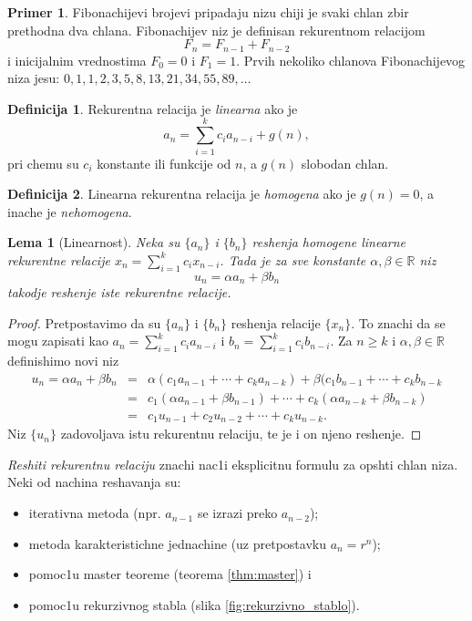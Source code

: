 \documentclass{article}
\newtheorem{lema}{Lema}[section]
\theoremstyle{definition}
\newtheorem{definicija}{Definicija}[section]
\newtheorem{primer}{Primer}[section]
\begin{document}
\begin{primer}
Fibonachijevi brojevi pripadaju nizu chiji je svaki chlan zbir prethodna dva chlana. Fibonachijev niz je definisan rekurentnom relacijom $$F_n = F_{n-1} + F_{n-2}$$ i inicijalnim vrednostima $F_0 = 0$ i $F_1 = 1$. Prvih nekoliko chlanova Fibonachijevog niza jesu: $0,1,1,2,3,5,8,13,21,34,55,89,\ldots$
\end{primer}

\begin{definicija}
Rekurentna relacija je \emph{linearna} ako je $$a_n = \sum_{i=1}^{k} c_i a_{n-i} + g(n),$$ pri chemu su $c_i$ konstante ili funkcije od $n$, a $g(n)$ slobodan chlan.
\end{definicija}

\begin{definicija}
Linearna rekurentna relacija je \emph{homogena} ako je $g(n) = 0$, a inache je \emph{nehomogena}.
\end{definicija}

\begin{lema}[Linearnost]
Neka su $\{a_n\}$ i $\{b_n\}$ reshenja homogene linearne rekurentne relacije $x_n = \sum_{i=1}^{k} c_i x_{n-i}$. Tada je za sve konstante $\alpha,\beta\in\mathbb{R}$ niz $$u_n = \alpha a_n + \beta b_n$$ takodje reshenje iste rekurentne relacije.
\end{lema}

\begin{proof}
Pretpostavimo da su $\{a_n\}$ i $\{b_n\}$ reshenja relacije $\{x_n\}$. To znachi da se mogu zapisati kao $a_n = \sum_{i=1}^{k} c_i a_{n-i}$ i $b_n = \sum_{i=1}^{k} c_i b_{n-i}$.
Za $n\geqslant k$ i $\alpha,\beta\in\mathbb{R}$ definishimo novi niz
\begin{eqnarray*}
u_n = \alpha a_n + \beta b_n & = & \alpha(c_1 a_{n-1} +\cdots + c_k a_{n-k})+\beta(c_1 b_{n-1} +\cdots + c_k b_{n-k}\\
& = & c_1(\alpha a_{n-1}+\beta b_{n-1}) + \cdots + c_k(\alpha a_{n-k} + \beta b_{n-k})\\
& = & c_1 u_{n-1} + c_2 u_{n-2} + \cdots + c_k u_{n-k}.
\end{eqnarray*}
Niz $\{u_n\}$ zadovoljava istu rekurentnu relaciju, te je i on njeno reshenje.
\end{proof}

\emph{Reshiti rekurentnu relaciju} znachi nac1i eksplicitnu formulu za opshti chlan niza. Neki od nachina reshavanja su:
\begin{itemize}
\item iterativna metoda (npr. $a_{n-1}$ se izrazi preko $a_{n-2}$);
\item metoda karakteristichne jednachine (uz pretpostavku $a_n = r^n$);
\item pomoc1u master teoreme (teorema \ref{thm:master}) i
\item pomoc1u rekurzivnog stabla (slika \ref{fig:rekurzivno_stablo}).
\end{itemize}
\end{document}
